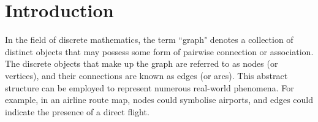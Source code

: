 


\pagestyle{fancy} %


\chapter{Introduction} %

\label{chap:ntroduction} %




In the field of discrete mathematics, the term ``graph" denotes a collection of distinct objects that may possess some form of pairwise connection or association. The discrete objects that make up the graph are referred to as nodes (or vertices), and their connections are known as edges (or arcs). This abstract structure can be employed to represent numerous real-world phenomena. For example, in an airline route map, nodes could symbolise airports, and edges could indicate the presence of a direct flight.

\vspace{0.1cm}


